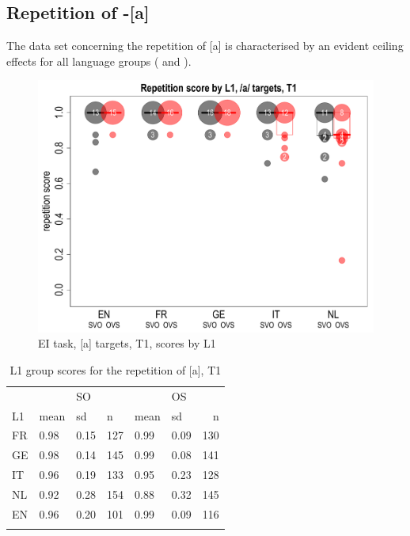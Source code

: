 \subsection{Repetition of -[a]}\label{sec:04:2.5}

The data set concerning the repetition of [a] is characterised by an evident ceiling effects for all language groups ( and ).

\begin{figure}
    \includegraphics[width=\textwidth]{figures/04-6.pdf}
    \caption{EI task, [a] targets, T1, scores by L1}
    \label{fig:04:6}
\end{figure}

\begin{table}
    \begin{tabularx}{\textwidth}{XXXXXXr}
    \lsptoprule
    & &{SO}& & &{OS}&\\
    L1 & mean & sd & n & mean & sd & n\\
    \midrule
    FR & 0.98 & 0.15 & 127 & 0.99 & 0.09 & 130\\
    GE & 0.98 & 0.14 & 145 & 0.99 & 0.08 & 141\\
    IT & 0.96 & 0.19 & 133 & 0.95 & 0.23 & 128\\
    NL & 0.92 & 0.28 & 154 & 0.88 & 0.32 & 145\\
    EN & 0.96 & 0.20 & 101 & 0.99 & 0.09 & 116\\
    \lspbottomrule
    \end{tabularx}
    \caption{L1 group scores for the repetition of [a], T1}
    \label{tab:04:7}
\end{table}

